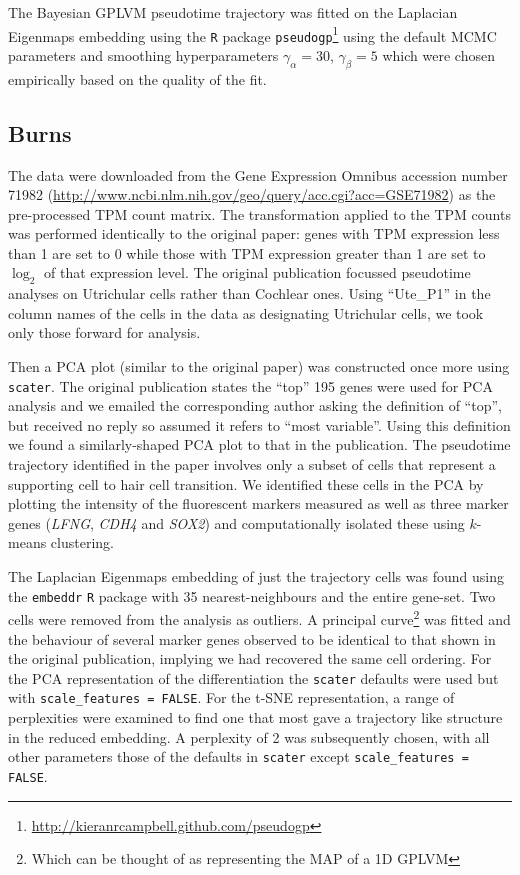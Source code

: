 The Bayesian GPLVM pseudotime trajectory was fitted on the Laplacian Eigenmaps embedding using the \texttt{R} package \texttt{pseudogp}\footnote{\url{http://kieranrcampbell.github.com/pseudogp}} using the default MCMC parameters and smoothing hyperparameters $\gamma_\alpha = 30$, $\gamma_\beta = 5$ which were chosen empirically based on the quality of the fit.

\subsection{Burns}
The data were downloaded from the Gene Expression Omnibus accession number 71982 (\url{http://www.ncbi.nlm.nih.gov/geo/query/acc.cgi?acc=GSE71982}) as the pre-processed TPM count matrix. The transformation applied to the TPM counts was performed identically to the original paper: genes with TPM expression less than 1 are set to 0 while those with TPM expression greater than 1 are set to $\log_2$ of that expression level. The original publication focussed pseudotime analyses on Utrichular cells rather than Cochlear ones. Using ``Ute\_P1'' in the column names of the cells in the data as designating Utrichular cells, we took only those forward for analysis.

Then a PCA plot (similar to the original paper) was constructed once more using \texttt{scater}. The original publication states the ``top'' 195 genes were used for PCA analysis and we emailed the corresponding author asking the definition of ``top'', but received no reply so assumed it refers to ``most variable''. Using this definition we found a similarly-shaped PCA plot to that in the publication. The pseudotime trajectory identified in the paper involves only a subset of cells that represent a supporting cell to hair cell transition. We identified these cells in the PCA by plotting the intensity of the fluorescent markers measured as well as three marker genes (\emph{LFNG}, \emph{CDH4} and \emph{SOX2}) and computationally isolated these using $k$-means clustering.

The Laplacian Eigenmaps embedding of just the trajectory cells was found using the \texttt{embeddr} \texttt{R} package with 35 nearest-neighbours and the entire gene-set. Two cells were removed from the analysis as outliers. A principal curve\footnote{Which can be thought of as representing the MAP of a 1D GPLVM} was fitted and the behaviour of several marker genes observed to be identical to that shown in the original publication, implying we had recovered the same cell ordering. For the PCA representation of the differentiation the \texttt{scater} defaults were used but with \texttt{scale\_features = FALSE}. For the t-SNE representation, a range of perplexities were examined to find one that most gave a trajectory like structure in the reduced embedding. A perplexity of 2 was subsequently chosen, with all other parameters those of the defaults in \texttt{scater} except \texttt{scale\_features = FALSE}.

